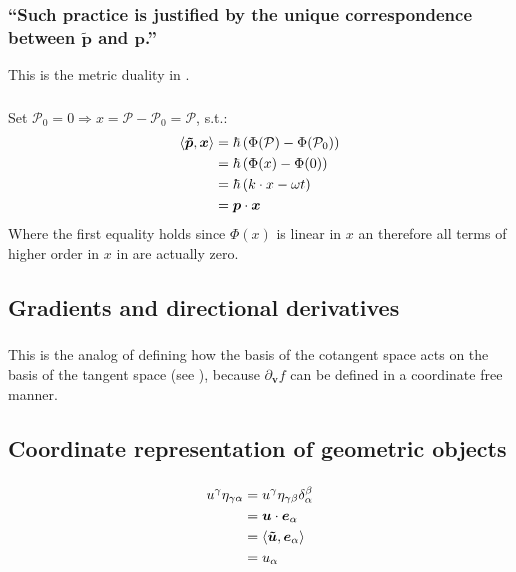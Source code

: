 \subsubsection{\enquote{Such practice is justified by the unique correspondence between $\boldsymbol{\tilde{p}}$ and $\boldsymbol{p}$.} }\label{sususec:2_5_p59_2}
This is the metric duality in \todo .

\subsubsection{ }
Set $\mathcal{P}_0=0 \Rightarrow x=\mathcal{P}-\mathcal{P}_0=\mathcal{P}$, s.t.:
\begin{align*} 
	\left\langle{\boldsymbol{\tilde{p}}},{\boldsymbol{x}}\right\rangle
	&=\hbar \left(\Phi(\mathcal{P})-\Phi(\mathcal{P}_0)\right)\\
	&=\hbar\left(\Phi(x)-\Phi(0)\right)\\
	&=\hbar\left(k\cdot x - \omega t\right)\\
	&=\boldsymbol{p}\cdot\boldsymbol{x}
\end{align*}
Where the first equality holds since $\Phi(x)$ is linear in $x$ an therefore all terms  of higher order in $x$ in  are actually zero.

\subsection{Gradients and directional derivatives}\label{susec:2_6}
\subsubsection{ }  
This is the analog of defining how the basis of the cotangent space acts on the basis of the tangent space (see ), because $\partial_{\boldsymbol{v}}f$ can be defined in a coordinate free manner.    

\subsection{Coordinate representation of geometric objects}\label{susec:2_7} 
\subsubsection{ }\label{sususec:exe_2_2}  
\begin{align*} 
	u^\gamma \eta_{\gamma \alpha}&=u^\gamma \eta_{\gamma \beta} \delta^\beta_\alpha\\
	&=\boldsymbol{u}\cdot \boldsymbol{e}_\alpha\\
	&=\left\langle{\boldsymbol{\tilde{u}}},{\boldsymbol{e}_\alpha}\right\rangle\\
	&=u_\alpha
\end{align*}
